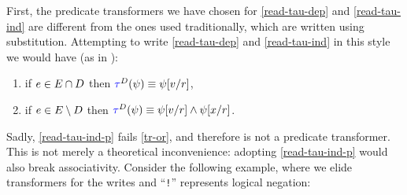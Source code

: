 First, the predicate transformers we have chosen for \ref{read-tau-dep}
and \ref{read-tau-ind} are different from the ones used traditionally, which
are written using substitution.  Attempting to write \ref{read-tau-dep} and
\ref{read-tau-ind} in this style we would have (as in
\cite{DBLP:journals/pacmpl/JagadeesanJR20}):
\begin{enumerate}%
\item[{\labeltext[\textsc{r}4a$'$]{(\textsc{r}4a$'$)}{read-tau-dep-p}}]
  if $e\in E\cap D$ then
  \begin{math}
    \aTr{\bEvs}{\bForm} \riff    
    \bForm[\aVal/\aReg]
  \end{math},    
\item[{\labeltext[\textsc{r}4b$'$]{(\textsc{r}4b$'$)}{read-tau-ind-p}}]
  if $e\in E\setminus D$ then
  \begin{math}
    \aTr{\bEvs}{\bForm} \riff    
    \bForm[\aVal/\aReg]
    \land
    \bForm[\aLoc/\aReg]
  \end{math}.
\end{enumerate}
Sadly, \ref{read-tau-ind-p} fails \ref{tr-or}, and therefore is not a
predicate transformer.  This is not merely a theoretical inconvenience:
adopting \ref{read-tau-ind-p} would also break associativity.  Consider the
following example, where we elide transformers for the writes and ``\texttt{!}''
represents logical negation:
